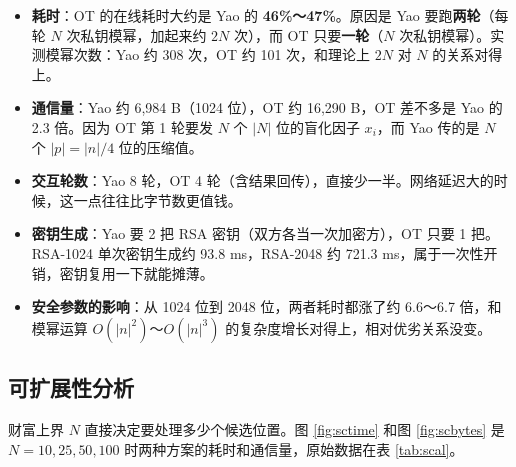 \documentclass{SYSUReport}
\begin{document}
\begin{itemize}
    \item \textbf{耗时}：OT 的在线耗时大约是 Yao 的 \textbf{46\%～47\%}。原因是 Yao 要跑\textbf{两轮}（每轮 $N$ 次私钥模幂，加起来约 $2N$ 次），而 OT 只要\textbf{一轮}（$N$ 次私钥模幂）。实测模幂次数：Yao 约 308 次，OT 约 101 次，和理论上 $2N$ 对 $N$ 的关系对得上。
    \item \textbf{通信量}：Yao 约 6,984 B（1024 位），OT 约 16,290 B，OT 差不多是 Yao 的 2.3 倍。因为 OT 第 1 轮要发 $N$ 个 $|N|$ 位的盲化因子 $x_i$，而 Yao 传的是 $N$ 个 $|p|=|n|/4$ 位的压缩值。
    \item \textbf{交互轮数}：Yao 8 轮，OT 4 轮（含结果回传），直接少一半。网络延迟大的时候，这一点往往比字节数更值钱。
    \item \textbf{密钥生成}：Yao 要 2 把 RSA 密钥（双方各当一次加密方），OT 只要 1 把。RSA-1024 单次密钥生成约 93.8 ms，RSA-2048 约 721.3 ms，属于一次性开销，密钥复用一下就能摊薄。
    \item \textbf{安全参数的影响}：从 1024 位到 2048 位，两者耗时都涨了约 6.6～6.7 倍，和模幂运算 $O(|n|^{2})$～$O(|n|^{3})$ 的复杂度增长对得上，相对优劣关系没变。
\end{itemize}

\subsection{可扩展性分析}

财富上界 $N$ 直接决定要处理多少个候选位置。图 \ref{fig:sctime} 和图 \ref{fig:scbytes} 是 $N=10,25,50,100$ 时两种方案的耗时和通信量，原始数据在表 \ref{tab:scal}。
\end{document}
